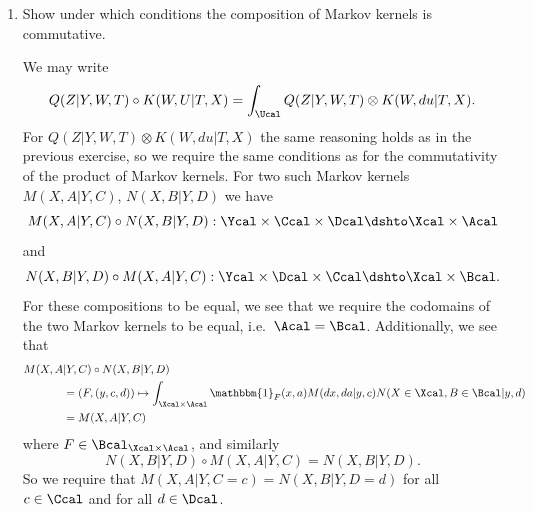 \begin{enumerate}
\begin{enumerate}
  \begin{gradedsolution}
    Consider
    \begin{align*}
      Q(Z | &Y, W, T) \otimes K(W, U|T, X) \\
      &= (E, y, t, x) \mapsto \int_{\Wcal\times \Ucal}\int_{\Zcal} \mathbbm{1}_{E}(z, w, u)Q(dz | y,w, t)K(dw, du| t, x) 
    \end{align*}
    for $E \in \Bcal_{\Zcal\times\Wcal\times\Ucal}$. Now, if we were to swap the integration order, we'd end up with an ill-posed expression
    \begin{align*}
      (E, y, t, x) \mapsto \int_{\Zcal}\int_{\Wcal\times \Ucal} \mathbbm{1}_{E}(z, w, u)K(dw, du| t, x) Q(dz | y,w, t)
    \end{align*}
    as the variable $w$ is undefined. On the other hand, we have
    \begin{align*}
      &K(W, U|T, X) \otimes Q(Z | Y, \widetilde{W}, T) : \Tcal \times \Xcal \times \Ycal \times \Wcal \dshto \Wcal \times \Ucal \times \Zcal, \\
      &(E, t, x, y, \tilde{w}) \mapsto \int_{\Zcal}\int_{\Wcal\times \Ucal} \mathbbm{1}_{E}(w, u, z)K(dw, du|t, x)Q(dz|y, \tilde{w}, t).
    \end{align*}
    From this we see that in general the product of Markov kernels commutes when no variable on the left hand side of the conditioning bar in one Markov kernel is also on the right hand side of the conditioning bar of the other Markov kernel.
  \end{gradedsolution}
  \item Show under which conditions the composition of Markov kernels is commutative.

  \begin{gradedsolution}
    We may write
    $$Q(Z | Y, W, T) \circ K(W, U|T, X) = \int_\Ucal Q(Z | Y, W, T) \otimes K(W, du|T, X).$$ For $Q(Z | Y, W, T) \otimes K(W, du|T, X)$ the same reasoning holds as in the previous exercise, so we require the same conditions as for the commutativity of the product of Markov kernels. For two such Markov kernels $M(X, A| Y, C)$, $N(X, B| Y, D)$ we have 
    $$M(X, A| Y, C) \circ N(X, B| Y, D): \Ycal \times \Ccal \times \Dcal \dshto \Xcal \times \Acal$$
    and
    $$N(X, B| Y, D) \circ M(X, A| Y, C): \Ycal \times \Dcal \times \Ccal \dshto \Xcal \times \Bcal.$$
    For these compositions to be equal, we see that we require the codomains of the two Markov kernels to be equal, i.e.\ $\Acal = \Bcal$. Additionally, we see that
    \begin{align*}
      M(X, A&| Y, C) \circ N(X, B| Y, D) \\
      &= (F, (y,c,d)) \mapsto \int_{\Xcal\times \Acal}\mathbbm{1}_{F}(x,a)M(dx, da|y, c)N(X\in\Xcal, B\in\Bcal|y, d) \\
      &= M(X, A|Y,C)
    \end{align*}
    where $F\in\Bcal_{\Xcal\times\Acal}$, and similarly
    $$N(X, B| Y, D) \circ M(X, A| Y, C) = N(X, B| Y, D).$$
    So we require that $M(X, A|Y, C=c) = N(X, B|Y, D=d)$ for all $c\in\Ccal$ and for all $d\in\Dcal$.
  \end{gradedsolution}
\end{enumerate}


\end{enumerate}

